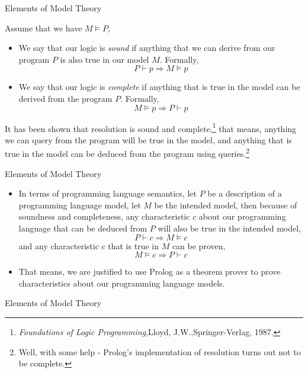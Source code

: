 \documentclass{beamer}
\begin{document}
\begin{frame}[fragile]{Elements of Model Theory}

\small
Assume that we have $M \models P$, 
\begin{itemize}
\item 
We say that our logic is {\em sound} if anything that we can derive from our program $P$
is also true in our model $M$. Formally,
\[
P \vdash p \Rightarrow M \models p
\]

\item
We say that our logic is {\em complete} if anything that is true in the model can be
derived from the program $P$. Formally,
\[
M \models p \Rightarrow P \vdash p
\]

\end{itemize}

It has been shown that resolution is sound and complete,\footnote{
{\it Foundations of Logic Programming},Lloyd, J.W.,Springer-Verlag, 1987.}
that means, anything we can query from the program will be true in
the model, and anything that is true in the model can be deduced from the
program using queries.\footnote{Well, with some help - Prolog's implementation 
of resolution turns out not to be complete.}
\end{frame}


\begin{frame}[fragile]{Elements of Model Theory}

\small
\begin{itemize}
\item 
In terms of programming language semantics, let $P$ be a description of
a programming language model, let $M$ be the intended model, then because
of soundness and completeness, any characteristic $c$ about our 
programming language that can be deduced from $P$ will also be true 
in the intended model,
\[
P \vdash c \Rightarrow M \models c
\]
and any characteristic $c$ that is true in $M$ can be proven,
\[
M \models c \Rightarrow P \vdash c
\]

\item
That means, we are justified to use Prolog as a theorem prover to prove
characteristics about our programming language models.
\end{itemize}

\end{frame}

\begin{frame}[fragile]{Elements of Model Theory}

\begin{center}
\end{center}
\end{frame}
\end{document}
